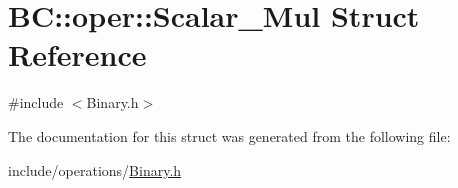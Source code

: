 \hypertarget{structBC_1_1oper_1_1Scalar__Mul}{}\section{BC\+:\+:oper\+:\+:Scalar\+\_\+\+Mul Struct Reference}
\label{structBC_1_1oper_1_1Scalar__Mul}


{\ttfamily \#include $<$Binary.\+h$>$}



The documentation for this struct was generated from the following file\+:\begin{DoxyCompactItemize}
\item 
include/operations/\hyperlink{Binary_8h}{Binary.\+h}\end{DoxyCompactItemize}
